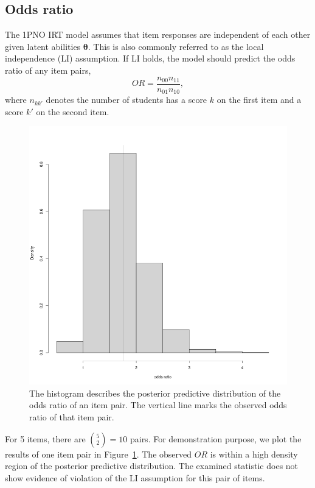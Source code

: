 \documentclass[floatsintext, man]{apa7}
\begin{document}
\subsection{Odds ratio}
The 1PNO IRT model assumes that item responses are independent of each other
given latent abilities $\bm{\theta}$. This is also commonly referred to as the
local independence (LI) assumption. If LI holds, the model should predict the
odds ratio of any item pairs,
\begin{equation}
  OR = \frac{n_{00} n_{11}}{n_{01} n_{10}},
\end{equation}
where $n_{kk'}$ denotes the number of students has a score $k$ on the first item
and a score $k'$ on the second item.
\begin{figure}
  \centering
  \includegraphics[scale=0.4]{Fig/ppmc_or.png}
  \caption{The histogram describes the posterior predictive distribution of the
  odds ratio of an item pair. The vertical line marks the observed odds ratio
  of that item pair.}
  \label{fig:ppmc_or}
\end{figure}
For 5 items, there are $\binom{5}{2} = 10$ pairs. For demonstration purpose, we
plot the results of one item pair in Figure~\ref{fig:ppmc_or}. The observed $OR$
is within a high density region of the posterior predictive distribution. The
examined statistic does not show evidence of violation of the LI assumption for
this pair of items.
\end{document}
